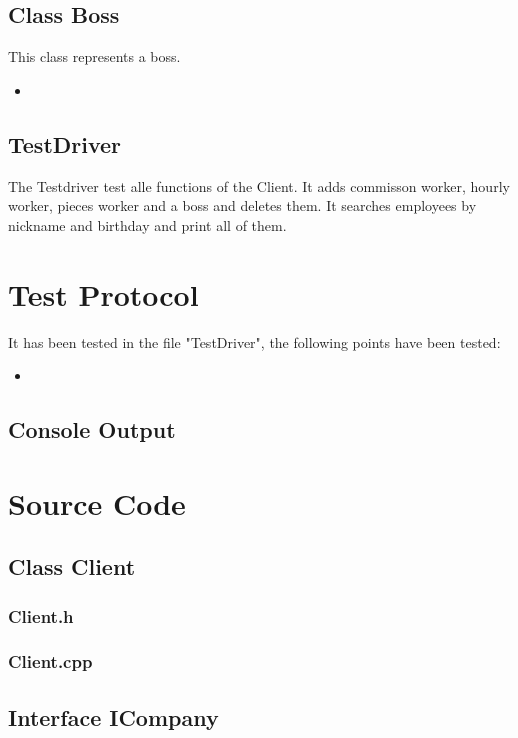 \subsection{Class Boss}
This class represents a boss.
\begin{itemize}
	\item
\end{itemize}

\subsection{TestDriver}
The Testdriver test alle functions of the Client. It adds commisson worker, hourly worker, pieces worker and a boss and deletes them.
It searches employees by nickname and birthday and print all of them.

\newpage
\section{Test Protocol}
It has been tested in the file "TestDriver", the following points have been tested:
\begin{itemize}
	\item 
\end{itemize}

\subsection{Console Output}
\newpage

\section{Source Code}


\subsection{Class Client}
\subsubsection{Client.h}
\newpage
\subsubsection{Client.cpp}

\subsection{Interface ICompany}
